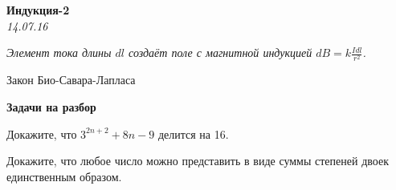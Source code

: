 \begin{center}
\textbf{\Large Индукция-2}\\
\textit{14.07.16}
\end{center}

\epigraph{\it Элемент тока длины $dl$ создаёт поле с магнитной индукцией $dB = k\frac{Idl}{r^2}$.}{Закон Био-Савара-Лапласа}

{\bf Задачи на разбор}
\begin{problems}

\item Докажите, что $3^{2n+2}+8n-9$ делится на 16.
\item Докажите, что любое число можно представить в виде суммы степеней двоек единственным образом.



\end{problems}
\resetproblem


